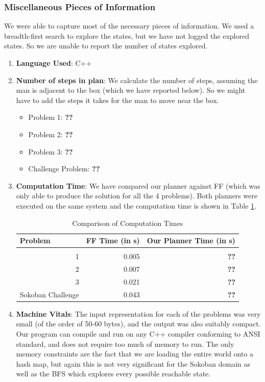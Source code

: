 \documentclass[10pt, letter]{article}
\begin{document}
\subsubsection*{Miscellaneous Pieces of Information}
We were able to capture most of the necessary pieces of information. We used a breadth-first search to explore the states, but we have not logged the explored states. So we are unable to report the number of states explored.
\begin{enumerate}
\item \textbf{Language Used}: C++
\item \textbf{Number of steps in plan}: We calculate the number of steps, assuming the man is adjacent to the box (which we have reported below). So we might have to add the steps it takes for the man to move near the box.
\begin{itemize}
\item Problem 1: \textbf{??}
\item Problem 2: \textbf{??}
\item Problem 3: \textbf{??}
\item Challenge Problem: \textbf{??}
\end{itemize}
\item \textbf{Computation Time}: We have compared our planner against FF (which was only able to produce the solution for all the 4 problems). Both planners were executed on the same system and the computation time is shown in Table \ref{tab1}.

\begin{table}[htbp]
\caption{Comparison of Computation Times}
\centering
\begin{tabular}{|r|r|r|}
\hline
\multicolumn{1}{|l|}{Problem} & \multicolumn{1}{l|}{FF Time (in s)} & \multicolumn{1}{l|}{Our Planner Time (in s)} \\ \hline
\multicolumn{1}{|l|}{} & \multicolumn{1}{l|}{} & \multicolumn{1}{l|}{} \\ \hline
1 & 0.005 & \textbf{??} \\ \hline
2 & 0.007 & \textbf{??} \\ \hline
3 & 0.021 & \textbf{??} \\ \hline
Sokoban Challenge & 0.043 & \textbf{??} \\ \hline
\end{tabular}
\label{tab1}
\end{table}

\item \textbf{Machine Vitals}: The input representation for each of the problems was very small (of the order of 50-60 bytes), and the output was also suitably compact. Our program can compile and run on any C++ compiler conforming to ANSI standard, and does not require too much of memory to run. The only memory constraints are the fact that we are loading the entire world onto a hash map, but again this is not very significant for the Sokoban domain as well as the BFS which explores every possible reachable state.
\end{enumerate}
\end{document}
